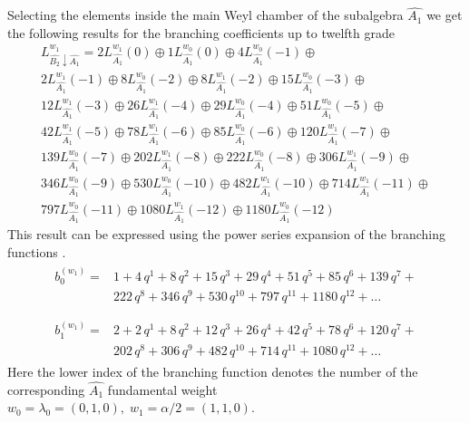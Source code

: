 \documentclass[a4paper,12pt]{article}
\theoremstyle{definition} \newtheorem{Def}{Definition}
\begin{document}
Selecting the elements inside the main Weyl chamber of the subalgebra $\hat{A_1}$ we get the following results for the branching coefficients up to twelfth grade
\begin{multline}
  \label{eq:28}
  L^{w_1}_{\hat{B_2}\downarrow \hat{A_1}}=2 L_{\hat{A_1}}^{w_1}(0)\oplus 1 L_{\hat{A_1}}^{w_0}(0)\oplus 4 L_{\hat{A_1}}^{w_0}(-1)\oplus\\
    2 L_{\hat{A_1}}^{w_1}(-1)\oplus 8 L_{\hat{A_1}}^{w_0}(-2)\oplus
    8 L_{\hat{A_1}}^{w_1}(-2)\oplus 15 L_{\hat{A_1}}^{w_0}(-3)\oplus\\
    12 L_{\hat{A_1}}^{w_1}(-3)\oplus 26 L_{\hat{A_1}}^{w_1}(-4)\oplus
    29 L_{\hat{A_1}}^{w_0}(-4)\oplus 51 L_{\hat{A_1}}^{w_0}(-5)\oplus\\
    42 L_{\hat{A_1}}^{w_1}(-5)\oplus 78 L_{\hat{A_1}}^{w_1}(-6)\oplus
    85 L_{\hat{A_1}}^{w_0}(-6)\oplus 120 L_{\hat{A_1}}^{w_1}(-7)\oplus\\
    139 L_{\hat{A_1}}^{w_0}(-7)\oplus 202 L_{\hat{A_1}}^{w_1}(-8)\oplus
    222 L_{\hat{A_1}}^{w_0}(-8)\oplus 306 L_{\hat{A_1}}^{w_1}(-9)\oplus\\
    346 L_{\hat{A_1}}^{w_0}(-9)\oplus 530 L_{\hat{A_1}}^{w_0}(-10)\oplus
    482 L_{\hat{A_1}}^{w_1}(-10)\oplus 714 L_{\hat{A_1}}^{w_1}(-11)\oplus\\
    797 L_{\hat{A_1}}^{w_0}(-11)\oplus 1080 L_{\hat{A_1}}^{w_1}(-12)\oplus
    1180 L_{\hat{A_1}}^{w_0}(-12)
\end{multline}
This result can be expressed using the power series expansion of the branching functions \cite{kac1990idl}.
\begin{eqnarray}
  \label{eq:29}
  \begin{array}{cc}
    b^{(w_1)}_{0}= & 1 + 4\,q^{1}+ 8\,q^{2}+ 15\,q^{3}+ 29\,q^{4}+ 51\,q^{5}+ 85\,q^{6}+ 139\,q^{7}+\\
     &222\,q^{8}+ 346\,q^{9}+ 530\,q^{10}+ 797\,q^{11}+ 1180\,q^{12}+\dots\\
  \end{array}\\
  \begin{array}{cc}
    b^{(w_1)}_{1}= &2+2\,q^{1}+8\,q^{2}+12\,q^{3}+26\,q^{4}+42\,q^{5}+78\,q^{6}+120\,q^{7}+\\
    & 202\,q^{8}+306\,q^{9}+482\,q^{10}+714\,q^{11}+1080\,q^{12}+\dots
  \end{array}
\end{eqnarray}
Here the lower index of the branching function denotes the number of the corresponding $\hat{A_1}$ fundamental weight $w_0=\lambda_0=(0,1,0),\; w_1=\alpha/2=(1,1,0)$.
\end{document}
